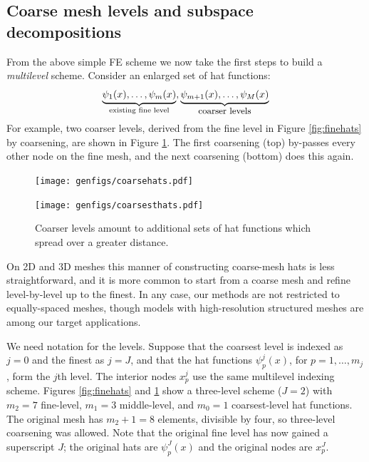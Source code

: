 \documentclass[letterpaper,final,12pt,reqno]{amsart}
\theoremstyle{claim}
\numberwithin{equation}{section}
\numberwithin{figure}{section}
\numberwithin{table}{section}
\numberwithin{theorem}{section}
\begin{document}
\subsection{Coarse mesh levels and subspace decompositions} \label{subsec:coarselevels}  From the above simple FE scheme we now take the first steps to build a \emph{multilevel} scheme.  Consider an enlarged set of hat functions:
    $$\underbrace{\psi_1(x),\dots,\psi_m(x)}_{\text{existing fine level}},\underbrace{\psi_{m+1}(x),\dots,\psi_M(x)}_{\text{\small coarser levels}}$$
For example, two coarser levels, derived from the fine level in Figure \ref{fig:finehats} by coarsening, are shown in Figure \ref{fig:coarsehats}.  The first coarsening (top) by-passes every other node on the fine mesh, and the next coarsening (bottom) does this again.

\begin{figure}
\texttt{[image: genfigs/coarsehats.pdf]}
\smallskip

\texttt{[image: genfigs/coarsesthats.pdf]}
\caption{Coarser levels amount to additional sets of hat functions which spread over a greater distance.}
\label{fig:coarsehats}
\end{figure}

On 2D and 3D meshes this manner of constructing coarse-mesh hats is less straightforward, and it is more common to start from a coarse mesh and refine level-by-level up to the finest.  In any case, our methods are not restricted to equally-spaced meshes, though models with high-resolution structured meshes \cite[for example]{Bueler2016,Winkelmannetal2011} are among our target applications.

We need notation for the levels.  Suppose that the coarsest level is indexed as $j=0$ and the finest as $j=J$, and that the hat functions $\psi_p^j(x)$, for $p=1,\dots,m_j$, form the $j$th level.  The interior nodes $x_p^j$ use the same multilevel indexing scheme.  Figures \ref{fig:finehats} and \ref{fig:coarsehats} show a three-level scheme ($J=2$) with $m_2=7$ fine-level, $m_1=3$ middle-level, and $m_0=1$ coarsest-level hat functions.  The original mesh has $m_2+1=8$ elements, divisible by four, so three-level coarsening was allowed.  Note that the original fine level has now gained a superscript $J$; the original hats are $\psi_p^J(x)$ and the original nodes are $x_p^J$.
\end{document}
